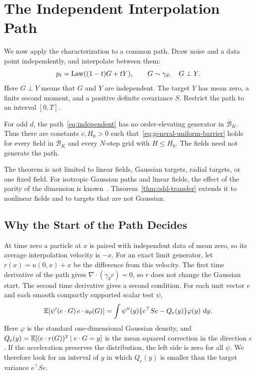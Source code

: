 \section{The Independent Interpolation Path}
\label{sec:odd}
We now apply the characterization to a common path. Draw noise and a
data point independently, and interpolate between them:
\begin{equation}\label{eq:independent}
 p_t=\operatorname{Law}((1-t)G+tY),\qquad G\sim\gamma_d,\quad G\perp Y.
\end{equation}
Here $G\perp Y$ means that $G$ and $Y$ are independent. The target $Y$
has mean zero, a finite second moment, and a positive definite
covariance $S$. Restrict the path to an interval
$[0,T]$.\AIassistance

\begin{theorem}\label{thm:odd-transfer}
For odd $d$, the path~\eqref{eq:independent} has no order-elevating
generator in $\overline{\mathcal B}_K$. Thus there are constants
$c,H_0>0$ such that~\eqref{eq:general-uniform-barrier} holds for every
field in $\mathcal B_K$ and every $N$-step grid with $H\le H_0$. The
fields need not generate the path.
\end{theorem}

The theorem is not limited to linear fields, Gaussian targets, radial
targets, or one fixed field. For isotropic Gaussian paths and linear
fields, the effect of the parity of the dimension is
known~\citep[Theorem~12]{obzherin2026density}.
Theorem~\ref{thm:odd-transfer} extends it to nonlinear fields and to
targets that are not Gaussian.

\subsection{Why the Start of the Path Decides}
At time zero a particle at $x$ is paired with independent data of mean
zero, so its average interpolation velocity is $-x$. For an exact limit
generator, let $r(x)=u(0,x)+x$ be the difference from this velocity. The
first time derivative of the path gives $\nabla\cdot(\gamma_dr)=0$, so
$r$ does not change the Gaussian start. The second time derivative gives
a second condition. For each unit vector $e$ and each smooth compactly supported scalar
test $\psi$,
\begin{equation}\label{eq:twojet-main}
\begin{split}
 \mathbb E[\psi'(e\cdot G)\,e\cdot a_0(G)]
 =\int\psi''(y)\{e^\top Se-Q_e(y)\}\varphi(y)\,\,\mathrm d y.
\end{split}
\end{equation}
Here $\varphi$ is the standard one-dimensional Gaussian density, and
$Q_e(y)=\mathbb E[(e\cdot r(G))^2\mid e\cdot G=y]$ is the mean squared
correction in the direction $e$. If the acceleration preserves the
distribution, the left side is zero for all $\psi$. We therefore look
for an interval of $y$ in which $Q_e(y)$ is smaller than the target
variance $e^\top Se$.

